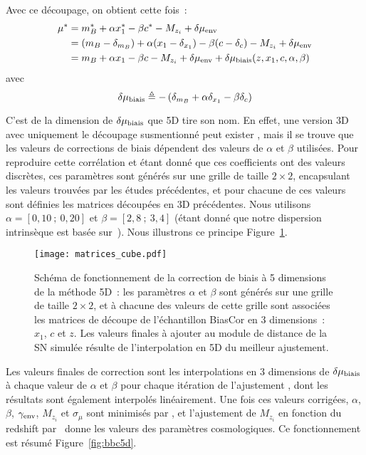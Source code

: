 \documentclass[../main/main.tex]{subfiles}
\begin{document}
Avec ce découpage, on obtient cette fois~:
\begin{align}\label{eq:mu5D}
    \mu^* & = m_B^* + \alpha x_1^* - \beta c^* - M_{z_i}
            + \delta\mu_{\rm env} \nonumber\\
          & = (m_B - \delta_{m_B}) + \alpha (x_1 - \delta_{x_1}) - \beta(c-\delta_c)
            - M_{z_i} + \delta\mu_{\rm env} \nonumber\\
          & = m_B + \alpha x_1 - \beta c - M_{z_i}
            + \delta\mu_{\rm env} + \delta\mu_{\rm biais}(z, x_1, c, \alpha, \beta)
\end{align}
avec
\begin{equation}\label{eq:bias5D}
    \delta\mu_{\rm biais} \triangleq
        - \left(\delta_{m_B} + \alpha \delta_{x_1} - \beta\delta_c\right)
\end{equation}

C'est de la dimension de $\delta\mu_{\rm biais}$ que \bbc5D tire son nom. En
effet, une version 3D avec uniquement le découpage susmentionné peut exister
\citep{scolnic2016}, mais il se trouve que les valeurs de corrections de biais
dépendent des valeurs de $\alpha$ et $\beta$ utilisées. Pour reproduire cette
corrélation et étant donné que ces coefficients ont des valeurs discrètes, ces
paramètres sont générés sur une grille de taille $2\times2$, encapsulant les
valeurs trouvées par les études précédentes, et pour chacune de ces valeurs sont
définies les matrices découpées en 3D précédentes. Nous utilisons $\alpha =
[0,10~;~0,20]$ et $\beta = [2,8~;~3,4]$ (étant donné que notre dispersion
intrinsèque est basée sur~). Nous illustrons ce principe
Figure~\ref{fig:mat5D}.

\begin{figure}[ht]
    \centering
    \texttt{[image: matrices\_cube.pdf]}
    \caption[Schéma de fonctionnement de la correction de biais à 5 dimensions
    de la méthode \bbc5D]{Schéma de fonctionnement de la correction de biais à 5
        dimensions de la méthode \bbc5D~: les paramètres $\alpha$ et $\beta$
        sont générés sur une grille de taille $2\times2$, et à chacune des
        valeurs de cette grille sont associées les matrices de découpe de
    l'échantillon BiasCor en 3 dimensions~: $x_1$, $c$ et $z$. Les valeurs
finales à ajouter au module de distance de la SN simulée résulte de
l'interpolation en 5D du meilleur ajustement.}
    \label{fig:mat5D}
\end{figure}

Les valeurs finales de correction sont les interpolations en 3 dimensions de
$\delta\mu_{\rm biais}$ à chaque valeur de $\alpha$ et $\beta$ pour chaque
itération de l'ajustement \bbc, dont les résultats sont également interpolés
linéairement. Une fois ces valeurs corrigées, $\alpha$, $\beta$, $\gamma_{\rm
env}$, $M_{z_i}$ et $\sigma_{\mu}$ sont minimisés par \saltmu, et l'ajustement
de $M_{z_i}$ en fonction du redshift par \wfit\ donne les valeurs des paramètres
cosmologiques. Ce fonctionnement est résumé Figure~\ref{fig:bbc5d}.
\end{document}
